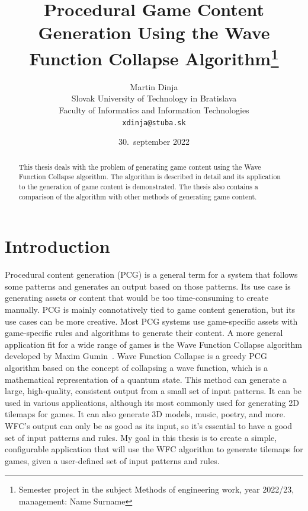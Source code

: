 \documentclass[10pt,oneside,a4paper]{article}
\title{Procedural Game Content Generation Using the Wave Function Collapse Algorithm\thanks{Semester project in the subject Methods of engineering work, year 2022/23, management: Name Surname}}
\author{Martin Dinja\\[2pt]
	{\small Slovak University of Technology in Bratislava}\\
	{\small Faculty of Informatics and Information Technologies}\\
	{\small \texttt{xdinja@stuba.sk}}
}
\date{\small 30.\ september 2022}
\begin{document}
\maketitle


\begin{abstract}
    \begin{center}
        This thesis deals with the problem of generating game content using the Wave Function Collapse algorithm. The algorithm is described in detail and its application to the generation of game content is demonstrated. The thesis also contains a comparison of the algorithm with other methods of generating game content.
    \end{center}
\end{abstract}

\section{Introduction}\label{sec:introduction}

Procedural content generation (PCG) is a general term for a system that follows some patterns and generates an output based on those patterns.
Its use case is generating assets or content that would be too time-consuming to create manually.
PCG is mainly connotatively tied to game content generation, but its use cases can be more creative.
Most PCG systems use game-specific assets with game-specific rules and algorithms to generate their content.
A more general application fit for a wide range of games is the Wave Function Collapse algorithm developed by Maxim Gumin~\cite{WFC}.
Wave Function Collapse is a greedy PCG algorithm based on the concept of collapsing a wave function, which is a mathematical representation of a quantum state.
This method can generate a large, high-quality, consistent output from a small set of input patterns.
It can be used in various applications, although its most commonly used for generating 2D tilemaps for games.
It can also generate 3D models, music, poetry, and more.
WFC's output can only be as good as its input, so it's essential to have a good set of input patterns and rules. 
My goal in this thesis is to create a simple, configurable application that will use the WFC algorithm to generate tilemaps for games, given a user-defined set of input patterns and rules.
\end{document}
